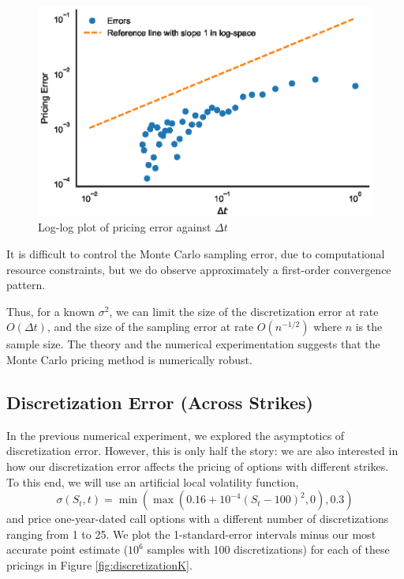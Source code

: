 \documentclass[11pt]{article}
\numberwithin{equation}{section}
\begin{document}
\begin{figure}[h!]
    \centering
    \includegraphics{figs/montecarlo_discrete.eps}
    \caption{Log-log plot of pricing error against $\Delta t$}
    \label{fig:log-log}
\end{figure}

It is difficult to control the Monte Carlo sampling error, due to computational
resource constraints, but we do observe approximately a first-order convergence
pattern. 
  
Thus, for a known $\sigma^2$, we can limit the size of the discretization error
at rate $O(\Delta t)$, and the size of the sampling error at rate $O(n^{-1/2})$
where $n$ is the sample size. The theory and the numerical experimentation
suggests that the Monte Carlo pricing method is numerically robust. 

\subsection{Discretization Error (Across Strikes)}

In the previous numerical experiment, we explored the asymptotics of
discretization error. However, this is only half the story: we are also
interested in how our discretization error affects the pricing of options with
different strikes. To this end, we will use an artificial local volatility
function,
\[ \sigma(S_t, t) = \min(\max(0.16 + 10^{-4}(S_t - 100)^2, 0), 0.3) \]
and price one-year-dated call options with a different number of discretizations
ranging from 1 to 25. We plot the 1-standard-error intervals minus our most
accurate point estimate ($10^6$ samples with 100 discretizations) for each of
these pricings in Figure \ref{fig:discretizationK}.
\end{document}
